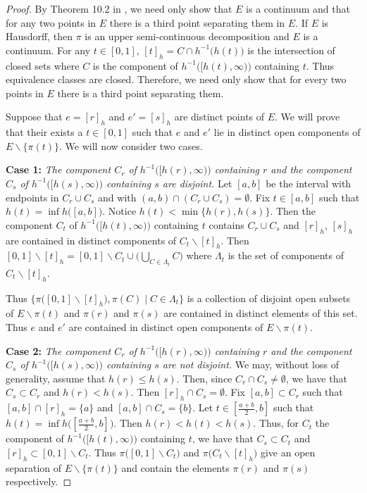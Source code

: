 \documentclass[11pt, leqno]{amsart}
\theoremstyle{definition}\newtheorem{definition}[theorem]{Definition}
\begin{document}
    \begin{proof}
        By Theorem 10.2 in \cite{Nadler1992}, we need only show that $E$ is a continuum and that for any two points in $E$ there is a third point separating them in $E$.  If $E$ is Hausdorff, then $\pi$ is an upper semi-continuous decomposition and $E$ is a continuum.  For any $t\in[0,1]$,  $[t]_h = C\cap h^{-1}\big(h(t)\big)$ is the intersection of closed sets where $C$ is the component of  $h^{-1}\big([h(t), \infty) \big)$ containing $t$.  Thus equivalence classes are closed.  Therefore, we need only show that for every two points in $E$ there is a third point separating them.
   



    Suppose that $e= [r]_h$ and $e'= [s]_h$ are distinct points of $E$.    We will prove that their exists a $t\in [0,1]$ such that $e$ and $e'$ lie in distinct open components of $E\backslash \big\{\pi(t)\big\}$. We will now consider two cases.  

    \textbf{Case 1:}  \emph{The component $C_r$ of $h^{-1}\big([h(r), \infty) \big)$ containing $r$ and the component $C_s$ of $h^{-1}\big([h(s), \infty) \big)$ containing $s$ are disjoint.}  Let $[a,b]$ be the interval with endpoints in $C_r\cup C_s$ and with $(a,b)\cap (C_r\cup C_s)=\emptyset$. Fix $t\in [a,b]$ such that $h(t) = \inf h\bigl([a,b]\big)$.  Notice $h(t) < \min \big\{h(r), h(s)\big\}$.  Then the component $C_t$ of  $h^{-1}\big([h(t), \infty) \big)$ containing $t$ contains $C_r\cup C_s$ and $[r]_h$, $[s]_h$ are contained in distinct components of $C_t\backslash [t]_h$.  Then $[0,1]\backslash [t]_h = [0,1]\backslash C_t \cup  \Big(\bigcup\limits_{C\in \Lambda_t} C\Big)$ where $\Lambda_t $ is the set of components of $C_t\backslash [t]_h$.

    
    Thus  $\Big\{\pi\big([0,1]\backslash [t]_h\big), \pi (C)\mid C\in \Lambda_t\Big\}$ is a collection of disjoint open subsets of $E\backslash \pi(t)$  and   $\pi(r)$ and $\pi(s)$ are contained in distinct elements of this set.  Thus $e$ and $e'$ are contained in distinct open components of $E\backslash \pi(t)$.
    
    \textbf{Case 2:}  \emph{The component $C_r$ of $h^{-1}\big([h(r), \infty) \big)$ containing $r$ and the component $C_s$ of $h^{-1}\big([h(s), \infty) \big)$ containing $s$ are not disjoint.}  We may, without loss of generality, assume that $h(r) \leq h(s)$.  Then, since $C_r\cap C_s \neq \emptyset$, we have that $C_s \subset C_r$ and $h(r)< h(s)$.  Then $[r]_h\cap C_s = \emptyset$.  Fix $[a,b]\subset C_r$ such that $[a,b]\cap [r]_h= \{a\}$ and $[a,b]\cap C_s = \{b\}$.  Let $t\in [\frac{a+b}{2},b]$ such that $h(t) =\inf h\big([\frac{a+b}{2},b]\bigr)$.  Then $h(r)< h(t)< h(s)$.  Thus, for $C_t$ the component of $h^{-1}\big([h(t), \infty) \big)$ containing $t$, we have that $C_s\subset C_t$ and $[r]_h \subset [0,1]\backslash C_t$.  Thus $\pi\big([0,1]\backslash C_t\big)$ and $\pi\big(C_t\backslash [t]_h\big) $ give an open separation of $E\backslash \{\pi(t)\}$ and contain the elements $\pi(r)$ and $\pi (s)$ respectively.


     \end{proof}
\end{document}
